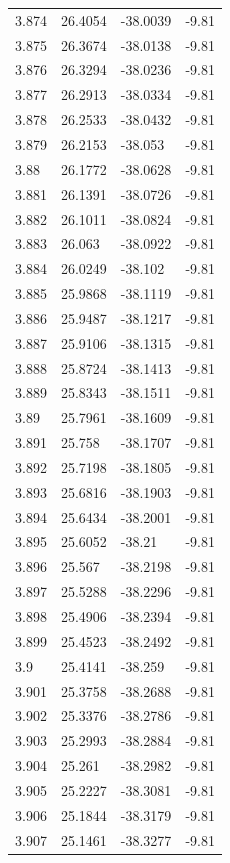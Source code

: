 \begin{tabular}{llll}
3.874 & 26.4054 & -38.0039 & -9.81 \\
3.875 & 26.3674 & -38.0138 & -9.81 \\
3.876 & 26.3294 & -38.0236 & -9.81 \\
3.877 & 26.2913 & -38.0334 & -9.81 \\
3.878 & 26.2533 & -38.0432 & -9.81 \\
3.879 & 26.2153 & -38.053 & -9.81 \\
3.88 & 26.1772 & -38.0628 & -9.81 \\
3.881 & 26.1391 & -38.0726 & -9.81 \\
3.882 & 26.1011 & -38.0824 & -9.81 \\
3.883 & 26.063 & -38.0922 & -9.81 \\
3.884 & 26.0249 & -38.102 & -9.81 \\
3.885 & 25.9868 & -38.1119 & -9.81 \\
3.886 & 25.9487 & -38.1217 & -9.81 \\
3.887 & 25.9106 & -38.1315 & -9.81 \\
3.888 & 25.8724 & -38.1413 & -9.81 \\
3.889 & 25.8343 & -38.1511 & -9.81 \\
3.89 & 25.7961 & -38.1609 & -9.81 \\
3.891 & 25.758 & -38.1707 & -9.81 \\
3.892 & 25.7198 & -38.1805 & -9.81 \\
3.893 & 25.6816 & -38.1903 & -9.81 \\
3.894 & 25.6434 & -38.2001 & -9.81 \\
3.895 & 25.6052 & -38.21 & -9.81 \\
3.896 & 25.567 & -38.2198 & -9.81 \\
3.897 & 25.5288 & -38.2296 & -9.81 \\
3.898 & 25.4906 & -38.2394 & -9.81 \\
3.899 & 25.4523 & -38.2492 & -9.81 \\
3.9 & 25.4141 & -38.259 & -9.81 \\
3.901 & 25.3758 & -38.2688 & -9.81 \\
3.902 & 25.3376 & -38.2786 & -9.81 \\
3.903 & 25.2993 & -38.2884 & -9.81 \\
3.904 & 25.261 & -38.2982 & -9.81 \\
3.905 & 25.2227 & -38.3081 & -9.81 \\
3.906 & 25.1844 & -38.3179 & -9.81 \\
3.907 & 25.1461 & -38.3277 & -9.81 \\

\end{tabular}
